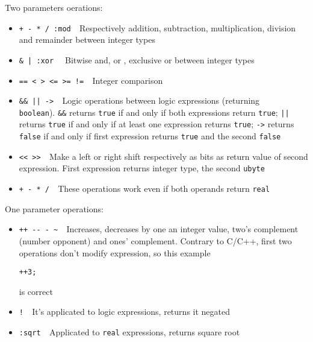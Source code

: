 \documentclass[10pt]{book}%
\newcommand{\code}[1]{\texttt{#1}}
\newenvironment{codeenv}{
\begin{mdframed}[backgroundcolor=black!20,topline=false,leftline=false,rightline=false,bottomline=false]
}
{\end{mdframed}}
\begin{document}
Two parameters oerations:
\begin{itemize}
\item \verb(+ - * / :mod  (Respectively addition, subtraction, multiplication, division and remainder between integer types
\item \verb+& | :xor  + Bitwise and, or , exclusive or between integer types
\item \verb+== < > <= >= !=  +Integer comparison
\item \verb+&& || ->  +Logic operations between logic expressions (returning \\ \code{boolean}). \verb+&&+ returns \code{true} if and only if both expressions return \code{true}; \verb+||+ returns \code{true} if and only if at least one expression returns \code{true}; \verb+->+ returns \code{false} if and only if first expression returns \code{true} and the second \code{false}
\item \verb+<< >>  +Make a left or right shift respectively as bits as return value of second expression. First expression returns integer type, the second \code{ubyte}
\item \verb(+ - * /  (These operations work even if both operands return \code{real}
\end{itemize}

One parameter operations:
\begin{itemize}
\item \verb(++ -- - ~  (Increases, decreases by one an integer value, two's complement (number opponent) and ones' complement. Contrary to C/C++, first two operations don't modify expression, so this example
\begin{codeenv}
\begin{verbatim}
++3;
\end{verbatim}
\end{codeenv}
is correct
\item \verb+!  +It's applicated to logic expressions, returns it negated
\item \verb+:sqrt  +Applicated to \code{real} expressions, returns square root
\end{itemize}
\end{document}
